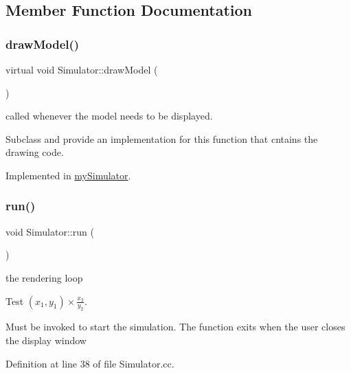\subsection{Member Function Documentation}
\mbox{\label{class_simulator_ad47f95a2a5201a46f760c14d63d84725}} 
\subsubsection{\texorpdfstring{drawModel()}{drawModel()}}
{\footnotesize\ttfamily virtual void Simulator\+::draw\+Model (\begin{DoxyParamCaption}{ }\end{DoxyParamCaption})\hspace{0.3cm}{\ttfamily [pure virtual]}}



called whenever the model needs to be displayed. 

Subclass and provide an implementation for this function that cntains the drawing code. 

Implemented in \mbox{\hyperlink{classmy_simulator_a6750776d452448e55ab0bfa130e67437}{my\+Simulator}}.

\mbox{\label{class_simulator_aa2de7e32b04cc3e8fc60aec23997621b}} 
\subsubsection{\texorpdfstring{run()}{run()}}
{\footnotesize\ttfamily void Simulator\+::run (\begin{DoxyParamCaption}{ }\end{DoxyParamCaption})}



the rendering loop 

Test $(x_1, y_1) \times \frac{x_2}{y_2}$.

Must be invoked to start the simulation. The function exits when the user closes the display window

Definition at line 38 of file Simulator.\+cc.


